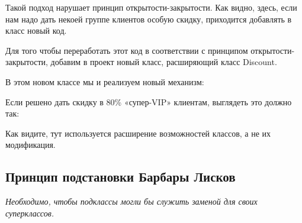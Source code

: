 \documentclass[a4paper]{article}
\begin{document}
Такой подход нарушает принцип открытости-закрытости. Как видно, здесь, если нам надо дать некоей группе клиентов особую скидку, приходится добавлять в класс новый код.

Для того чтобы переработать этот код в соответствии с принципом открытости-закрытости, добавим в проект новый класс, расширяющий класс Discount.

\newpage
В этом новом классе мы и реализуем новый механизм:

\begin{figure}[h]
\end{figure}

Если решено дать скидку в 80\% «супер-VIP» клиентам, выглядеть это должно так:

\begin{figure}[h]
\end{figure}

Как видите, тут используется расширение возможностей классов, а не их модификация.

\subsection{Принцип подстановки Барбары Лисков}

\textit{Необходимо, чтобы подклассы могли бы служить заменой для своих суперклассов.}
\end{document}
